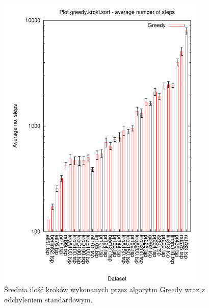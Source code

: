 \begin{figure}
\begin{center}
\includegraphics[width=0.9\textwidth]{wykresy/greedy_kroki}
\end{center}
\caption{Średnia ilość kroków wykonanych przez algorytm Greedy wraz z odchyleniem standardowym.}
\label{greedy_kroki}
\end{figure}



